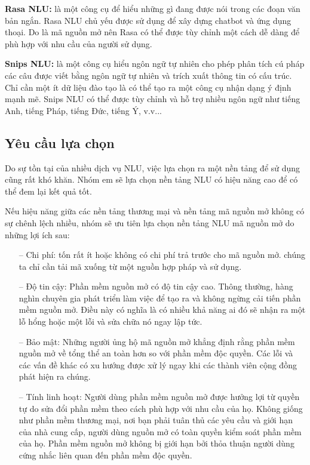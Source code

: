 \textbf{Rasa NLU:} là một công cụ để hiểu những gì đang được nói trong các đoạn văn bản ngắn. Rasa NLU chủ yếu được sử dụng để xây dựng chatbot và ứng dụng thoại. Do là mã nguồn mở nên Rasa có thể được tùy chỉnh một cách dễ dàng để phù hợp với nhu cầu của người sử dụng.

\textbf{Snips NLU:}  là một công cụ hiểu ngôn ngữ tự nhiên cho phép phân tích cú pháp các câu được viết bằng ngôn ngữ tự nhiên và trích xuất thông tin có cấu trúc. Chỉ cần một ít dữ liệu đào tạo là có thể tạo ra một công cụ nhận dạng ý định mạnh mẽ. Snips NLU có thể được tùy chỉnh và hỗ trợ nhiều ngôn ngữ như tiếng Anh, tiếng Pháp, tiếng Đức, tiếng Ý, v.v...

\subsection{Yêu cầu lựa chọn}
Do sự tồn tại của nhiều dịch vụ NLU, việc lựa chọn ra một nền tảng để sử dụng cũng rất khó khăn. Nhóm em sẽ lựa chọn nền tảng NLU có hiệu năng cao để có thể đem lại kết quả tốt.

Nếu hiệu năng giữa các nền tảng thương mại và nền tảng mã nguồn mở không có sự chênh lệch nhiều, nhóm sẽ ưu tiên lựa chọn nền tảng NLU mã nguồn mở do những lợi ích sau:
\begin{itemize}
    \item[--] Chi phí:  tốn rất ít hoặc không có chi phí trả trước cho mã nguồn mở. chúng ta chỉ cần tải mã xuống từ một nguồn hợp pháp và sử dụng.
    \item[--] Độ tin cậy: Phần mềm nguồn mở có độ tin cậy cao. Thông thường, hàng nghìn chuyên gia phát triển làm việc để tạo ra và không ngừng cải tiến phần mềm nguồn mở. Điều này có nghĩa là có nhiều khả năng ai đó sẽ nhận ra một lỗ hổng hoặc một lỗi và sửa chữa nó ngay lập tức.
    \item[--] Bảo mật: Những người ủng hộ mã nguồn mở khẳng định rằng phần mềm nguồn mở về tổng thể an toàn hơn so với phần mềm độc quyền. Các lỗi và các vấn đề khác có xu hướng được xử lý ngay khi các thành viên cộng đồng phát hiện ra chúng.
    \item[--] Tính linh hoạt: Người dùng phần mềm nguồn mở được hưởng lợi từ quyền tự do sửa đổi phần mềm theo cách phù hợp với nhu cầu của họ. Không giống như phần mềm thương mại, nơi bạn phải tuân thủ các yêu cầu và giới hạn của nhà cung cấp, người dùng nguồn mở có toàn quyền kiểm soát phần mềm của họ. Phần mềm nguồn mở không bị giới hạn bởi thỏa thuận người dùng cứng nhắc liên quan đến phần mềm độc quyền.
\end{itemize}

